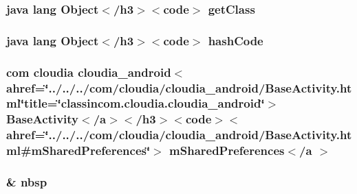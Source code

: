 \hypertarget{_show_all_activity_8html_a98e6644727fe65eac217a6855045be43}{
\subsubsection[{get\-Class}]{\setlength{\rightskip}{0pt plus 5cm}java lang Object$<$/h3$>$$<$code$>$ get\-Class}}\label{_show_all_activity_8html_a98e6644727fe65eac217a6855045be43}
\hypertarget{_show_all_activity_8html_a8e178e2bb2bef055ea23ea3910a221ca}{
\subsubsection[{hash\-Code}]{\setlength{\rightskip}{0pt plus 5cm}java lang Object$<$/h3$>$$<$code$>$ hash\-Code}}\label{_show_all_activity_8html_a8e178e2bb2bef055ea23ea3910a221ca}
\hypertarget{_show_all_activity_8html_a5b7f2b6398d46c2bac3442c34be02d25}{
\subsubsection[{m\-Shared\-Preferences$<$/a $>$}]{\setlength{\rightskip}{0pt plus 5cm}com cloudia cloudia\-\_\-android$<$ahref=\char`\"{}../../../com/cloudia/cloudia\-\_\-android/Base\-Activity.\-html\char`\"{}title=\char`\"{}classincom.\-cloudia.\-cloudia\-\_\-android\char`\"{}$>$ Base\-Activity$<$/{\bf a}$>$$<$/h3$>$$<$code$>$$<$ahref=\char`\"{}../../../com/cloudia/cloudia\-\_\-android/Base\-Activity.\-html\#m\-Shared\-Preferences\char`\"{}$>$ m\-Shared\-Preferences$<$/{\bf a} $>$}}\label{_show_all_activity_8html_a5b7f2b6398d46c2bac3442c34be02d25}
\hypertarget{_show_all_activity_8html_aef915316f784c9063d942974538301a6}{
\subsubsection[{nbsp}]{\setlength{\rightskip}{0pt plus 5cm}\& nbsp}}\label{_show_all_activity_8html_aef915316f784c9063d942974538301a6}
